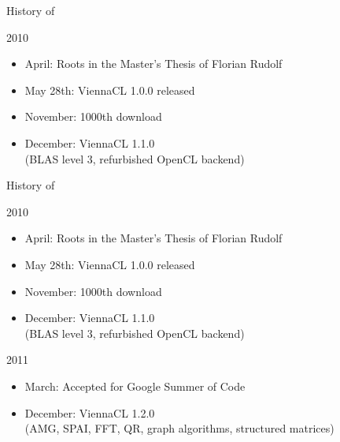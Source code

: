 % 
% 
% 







\begin{frame}{History of \ViennaCL}

\begin{block}{2010}
  \begin{itemize}
   \item April: Roots in the Master's Thesis of Florian Rudolf
   \item May 28th: ViennaCL 1.0.0 released
   \item November: 1000th download
   \item December: ViennaCL 1.1.0 \\(BLAS level 3, refurbished OpenCL backend)
  \end{itemize}
\end{block}

\vspace*{2.49cm}
\end{frame}



\begin{frame}{History of \ViennaCL}

\begin{block}{2010}
  \begin{itemize}
   \item April: Roots in the Master's Thesis of Florian Rudolf
   \item May 28th: ViennaCL 1.0.0 released
   \item November: 1000th download
   \item December: ViennaCL 1.1.0 \\(BLAS level 3, refurbished OpenCL backend)
  \end{itemize}
\end{block}

\begin{block}{2011}
  \begin{itemize}
   \item March: Accepted for Google Summer of Code
   \item December: ViennaCL 1.2.0 \\ (AMG, SPAI, FFT, QR, graph algorithms, structured matrices)
  \end{itemize}
\end{block}

\end{frame}



